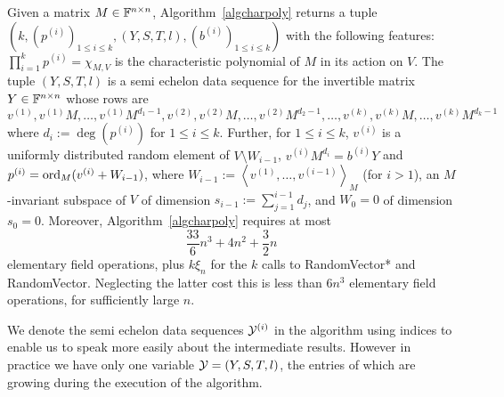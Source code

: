 \begin{Prop}
\label{propcharpoly}
Given a matrix $M \in \mathbb{F}^{n \times n}$, Algorithm~\ref{algcharpoly} returns
a tuple $(k,(p^{(i)})_{1 \le i \le k}, (Y,S,T,l),(b^{(i)})_{1 \le i \le k})$ 
with the following features: $\prod_{i=1}^k p^{(i)} = \chi_{M,V}$ is the 
characteristic polynomial
of $M$ in its action on $V$. The tuple $(Y,S,T,l)$ is a semi echelon data
sequence for the invertible matrix $Y \in \mathbb{F}^{n \times n}$ whose rows are
\[ v\!^{(1)}, v\!^{(1)}M, \ldots, v\!^{(1)}M^{d_1-1}, 
v\!^{(2)}, v\!^{(2)}M, \ldots, v\!^{(2)}M^{d_2-1},
   \ldots, v\!^{(k)}, v\!^{(k)}M, \ldots, v\!^{(k)} M^{d_k-1} 
\]
where $d_i := \deg(p^{(i)})$ for $1 \le i \le k$. Further, for $1 \le i \le k$,
$v^{(i)}$ is a uniformly distributed random element of\/ $V\setminus W_{i-1}$, 
$v^{(i)} M^{d_i} = b^{(i)} Y$ and $p^{(i)} = \mathrm{ord}_M(v^{(i)} + W_{i-1})$,
where $W_{i-1} := \left< v^{(1)}, \ldots, v^{(i-1)}\right>_M$ (for $i>1$), 
an $M$-invariant subspace of $V$ of dimension $s_{i-1}:=\sum_{j=1}^{i-1} d_j$, and 
$W_0=0$ of dimension $s_0=0$.
Moreover, Algorithm~\ref{algcharpoly} requires at most
\[
\frac{33}{6}n^3+4n^2+\frac{3}{2}n 
\]
elementary field operations, plus
$k\xi_{n}$ for the $k$ calls to {\sc RandomVector*} and {\sc RandomVector}. Neglecting 
the latter cost this  is less than $6n^3$ elementary field operations, for sufficiently large $n$.
\end{Prop}

\begin{Rem}
We denote the semi echelon data sequences 
$\mathcal{Y}^{(i)}$ in the algorithm using indices to enable us to speak 
more easily about the intermediate results. However in practice
we have only one variable $\mathcal{Y}=(Y,S,T,l)$, the entries of which are 
growing during the execution of the algorithm.
\end{Rem}


